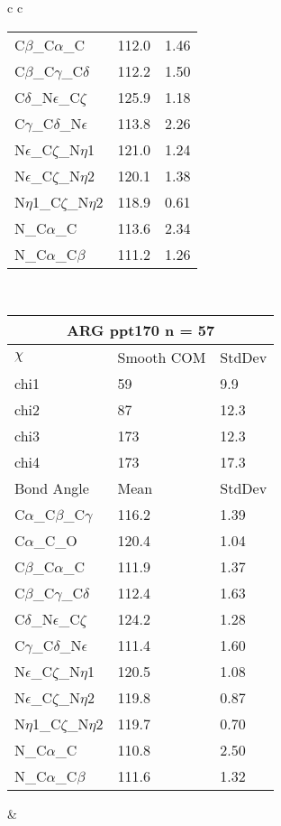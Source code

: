 \begin{longtable}{ c c }
\begin{tabular}{ l l l }
  C$\beta$\_C$\alpha$\_C & 112.0 & 1.46\\
  C$\beta$\_C$\gamma$\_C$\delta$ & 112.2 & 1.50\\
  C$\delta$\_N$\epsilon$\_C$\zeta$ & 125.9 & 1.18\\
  C$\gamma$\_C$\delta$\_N$\epsilon$ & 113.8 & 2.26\\
  N$\epsilon$\_C$\zeta$\_N$\eta$1 & 121.0 & 1.24\\
  N$\epsilon$\_C$\zeta$\_N$\eta$2 & 120.1 & 1.38\\
  N$\eta$1\_C$\zeta$\_N$\eta$2 & 118.9 & 0.61\\
  N\_C$\alpha$\_C & 113.6 & 2.34\\
  N\_C$\alpha$\_C$\beta$ & 111.2 & 1.26\\
  \bottomrule
  \end{tabular}
  \\
  \begin{tabular}{ l l l }
  \toprule
  \multicolumn{3}{c}{ARG \textbf{ppt170} n = 57} \\ \toprule
  $\chi$       & Smooth COM & StdDev \\ \midrule
  chi1 & 59 & 9.9 \\ 
  chi2 & 87 & 12.3 \\ 
  chi3 & 173 & 12.3 \\ 
  chi4 & 173 & 17.3 \\ \midrule
  Bond Angle   & Mean     & StdDev \\ \midrule
  C$\alpha$\_C$\beta$\_C$\gamma$ & 116.2 & 1.39\\
  C$\alpha$\_C\_O & 120.4 & 1.04\\
  C$\beta$\_C$\alpha$\_C & 111.9 & 1.37\\
  C$\beta$\_C$\gamma$\_C$\delta$ & 112.4 & 1.63\\
  C$\delta$\_N$\epsilon$\_C$\zeta$ & 124.2 & 1.28\\
  C$\gamma$\_C$\delta$\_N$\epsilon$ & 111.4 & 1.60\\
  N$\epsilon$\_C$\zeta$\_N$\eta$1 & 120.5 & 1.08\\
  N$\epsilon$\_C$\zeta$\_N$\eta$2 & 119.8 & 0.87\\
  N$\eta$1\_C$\zeta$\_N$\eta$2 & 119.7 & 0.70\\
  N\_C$\alpha$\_C & 110.8 & 2.50\\
  N\_C$\alpha$\_C$\beta$ & 111.6 & 1.32\\
  \bottomrule
  \end{tabular}
  &
  \begin{tabular}{ l l l }

\end{tabular}
\end{longtable}
